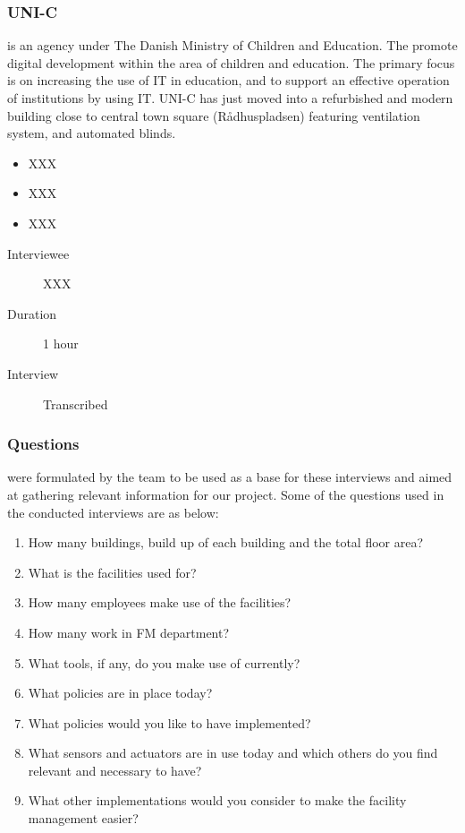 \subsubsection{UNI-C} is an agency under The Danish Ministry of Children and Education. The promote digital development within the area of children and education. The primary focus is on increasing the use of IT in education, and to support an effective operation of institutions by using IT. UNI-C has just moved into a refurbished and modern building close to central town square (R\aa dhuspladsen) featuring ventilation system, and automated blinds.
\begin{itemize}
	\item XXX
	\item XXX
	\item XXX
\end{itemize}
\begin{description}
	\item[Interviewee] XXX
	\item[Duration] 1 hour
	\item[Interview] Transcribed
\end{description}

\subsubsection{Questions} were formulated by the team to be used as a base for these interviews and aimed at gathering relevant information for our project. Some of the questions used in the conducted interviews are as below:
\begin{enumerate}
	\item How many buildings, build up of each building and the total floor area?
	\item What is the facilities used for? 
	\item How many employees make use of the facilities?
	\item How many work in FM department?
	\item What tools, if any, do you make use of currently?
	\item What policies are in place today?
	\item What policies would you like to have implemented?
	\item What sensors and actuators are in use today and which others do you find relevant and necessary to have?
	\item What other implementations would you consider to make the facility management easier?
\end{enumerate}


